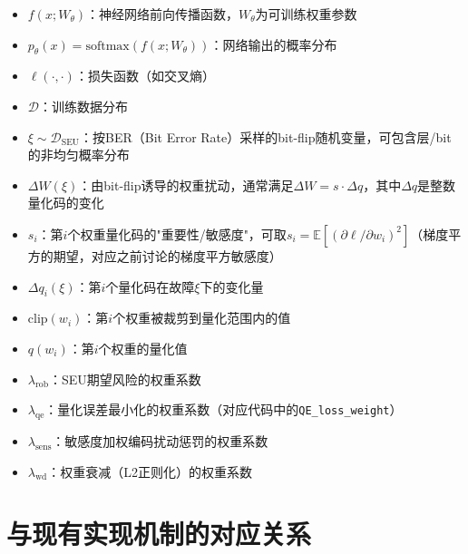 \documentclass[12pt]{article}
\begin{document}
\begin{itemize}
    \item $f(x;W_\theta)$：神经网络前向传播函数，$W_\theta$为可训练权重参数
    \item $p_\theta(x)=\mathrm{softmax}(f(x;W_\theta))$：网络输出的概率分布
    \item $\ell(\cdot,\cdot)$：损失函数（如交叉熵）
    \item $\mathcal{D}$：训练数据分布
    \item $\xi \sim \mathcal{D}_{\text{SEU}}$：按BER（Bit Error Rate）采样的bit-flip随机变量，可包含层/bit的非均匀概率分布
    \item $\Delta W(\xi)$：由bit-flip诱导的权重扰动，通常满足$\Delta W = s\cdot \Delta q$，其中$\Delta q$是整数量化码的变化
    \item $s_i$：第$i$个权重量化码的"重要性/敏感度"，可取$s_i=\mathbb{E}[(\partial \ell/\partial w_i)^2]$（梯度平方的期望，对应之前讨论的梯度平方敏感度）
    \item $\Delta q_i(\xi)$：第$i$个量化码在故障$\xi$下的变化量
    \item $\mathrm{clip}(w_i)$：第$i$个权重被裁剪到量化范围内的值
    \item $q(w_i)$：第$i$个权重的量化值
    \item $\lambda_{\text{rob}}$：SEU期望风险的权重系数
    \item $\lambda_{\text{qe}}$：量化误差最小化的权重系数（对应代码中的\texttt{QE\_loss\_weight}）
    \item $\lambda_{\text{sens}}$：敏感度加权编码扰动惩罚的权重系数
    \item $\lambda_{\text{wd}}$：权重衰减（L2正则化）的权重系数
\end{itemize}

\section{与现有实现机制的对应关系}
\end{document}
